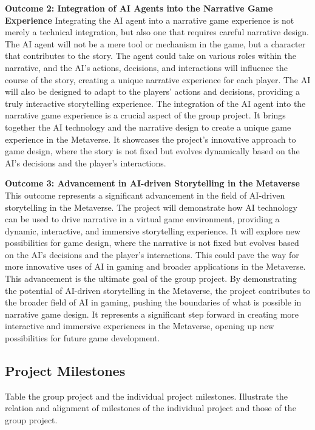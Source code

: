 \textbf{Outcome 2: Integration of AI Agents into the Narrative Game Experience}\quad
Integrating the AI agent into a narrative game experience is not merely a technical integration, but also one that requires careful narrative design. The AI agent will not be a mere tool or mechanism in the game, but a character that contributes to the story. 
The agent could take on various roles within the narrative, and the AI's actions, decisions, and interactions will influence the course of the story, creating a unique narrative experience for each player. 
The AI will also be designed to adapt to the players' actions and decisions, providing a truly interactive storytelling experience.
The integration of the AI agent into the narrative game experience is a crucial aspect of the group project. It brings together the AI technology and the narrative design to create a unique game experience in the Metaverse. 
It showcases the project's innovative approach to game design, where the story is not fixed but evolves dynamically based on the AI's decisions and the player's interactions.

\textbf{Outcome 3: Advancement in AI-driven Storytelling in the Metaverse}\quad
This outcome represents a significant advancement in the field of AI-driven storytelling in the Metaverse. 
The project will demonstrate how AI technology can be used to drive narrative in a virtual game environment, providing a dynamic, interactive, and immersive storytelling experience. 
It will explore new possibilities for game design, where the narrative is not fixed but evolves based on the AI's decisions and the player's interactions. 
This could pave the way for more innovative uses of AI in gaming and broader applications in the Metaverse.
This advancement is the ultimate goal of the group project. By demonstrating the potential of AI-driven storytelling in the Metaverse, 
the project contributes to the broader field of AI in gaming, pushing the boundaries of what is possible in narrative game design. 
It represents a significant step forward in creating more interactive and immersive experiences in the Metaverse, opening up new possibilities for future game development.

\subsection{Project Milestones}
Table the group project and the individual project milestones. 
Illustrate the relation and alignment of milestones of the individual project and those of the group project.

